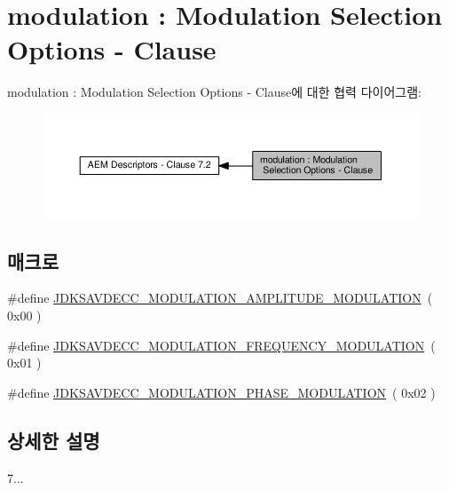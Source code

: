 \hypertarget{group__modulation}{}\section{modulation \+: Modulation Selection Options -\/ Clause}
\label{group__modulation}
modulation \+: Modulation Selection Options -\/ Clause에 대한 협력 다이어그램\+:
\nopagebreak
\begin{figure}[H]
\begin{center}
\leavevmode
\includegraphics[width=350pt]{group__modulation}
\end{center}
\end{figure}
\subsection*{매크로}
\begin{DoxyCompactItemize}
\item 
\#define \hyperlink{group__modulation_gafcd89fa6362ca123b983ef23b345a495}{J\+D\+K\+S\+A\+V\+D\+E\+C\+C\+\_\+\+M\+O\+D\+U\+L\+A\+T\+I\+O\+N\+\_\+\+A\+M\+P\+L\+I\+T\+U\+D\+E\+\_\+\+M\+O\+D\+U\+L\+A\+T\+I\+ON}~( 0x00 )
\item 
\#define \hyperlink{group__modulation_ga7fdd4cdce4b86cbfbb8c742d37495d72}{J\+D\+K\+S\+A\+V\+D\+E\+C\+C\+\_\+\+M\+O\+D\+U\+L\+A\+T\+I\+O\+N\+\_\+\+F\+R\+E\+Q\+U\+E\+N\+C\+Y\+\_\+\+M\+O\+D\+U\+L\+A\+T\+I\+ON}~( 0x01 )
\item 
\#define \hyperlink{group__modulation_gaaec107d99238cf23bbb667caf24655d4}{J\+D\+K\+S\+A\+V\+D\+E\+C\+C\+\_\+\+M\+O\+D\+U\+L\+A\+T\+I\+O\+N\+\_\+\+P\+H\+A\+S\+E\+\_\+\+M\+O\+D\+U\+L\+A\+T\+I\+ON}~( 0x02 )
\end{DoxyCompactItemize}


\subsection{상세한 설명}
7... 


